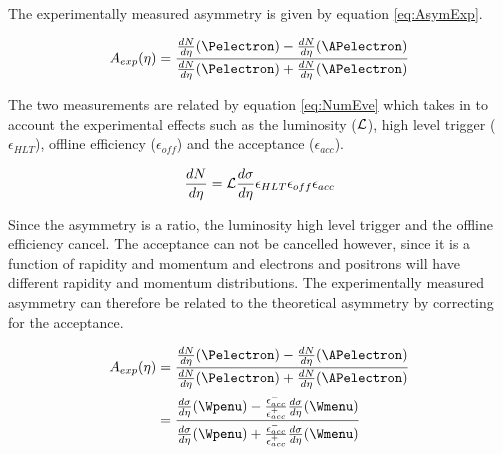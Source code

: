 The experimentally measured asymmetry is given by equation
\ref{eq:AsymExp}.\cite{kom}
 
\begin{equation}
A_{exp}(\eta)=\frac{  \frac{dN}{d\eta}(\Pelectron) -
\frac{dN}{d\eta}(\APelectron) }{ \frac{dN}{d\eta}(\Pelectron) +
\frac{dN}{d\eta}(\APelectron) }
\label{eq:AsymExp}
\end{equation} 

The two measurements are related by equation \ref{eq:NumEve} which takes in to
account the experimental effects such as the luminosity (${\cal L}$), high
level trigger ($\epsilon_{HLT}$), offline efficiency ($ \epsilon_{off}$) and
the acceptance ($\epsilon_{acc}$).

\begin{equation}
\frac{dN}{d\eta} = {\cal L } \frac{d\sigma}{d\eta}  \epsilon_{HLT}
\epsilon_{off} \epsilon_{acc}
\label{eq:NumEve}
\end{equation} 

Since the asymmetry is a ratio, the luminosity high level trigger and the
offline efficiency cancel.\cite{me} The acceptance can not be cancelled
however, since it is a function of rapidity and momentum and electrons and
positrons will have different rapidity and momentum distributions. The
experimentally measured asymmetry can therefore be related to the theoretical
asymmetry by correcting for the acceptance.\cite{me}

\begin{align} 
A_{exp}(\eta) &= \frac{ \frac{dN}{d\eta}(\Pelectron) -
\frac{dN}{d\eta}(\APelectron) }{ \frac{dN}{d\eta}(\Pelectron) +
\frac{dN}{d\eta}(\APelectron) }\\   
              &= \frac{ \frac{d\sigma}{d\eta}(\Wpenu) -
\frac{\epsilon^{-}_{acc}}{\epsilon^{+}_{acc}} \frac{d\sigma}{d\eta}(\Wmenu) }{
\frac{d\sigma}{d\eta}(\Wpenu) + \frac{\epsilon^{-}_{acc}}{\epsilon^{+}_{acc}}
\frac{d\sigma}{d\eta}(\Wmenu) }
\label{eq:AsymExpCorr}
\end{align}

